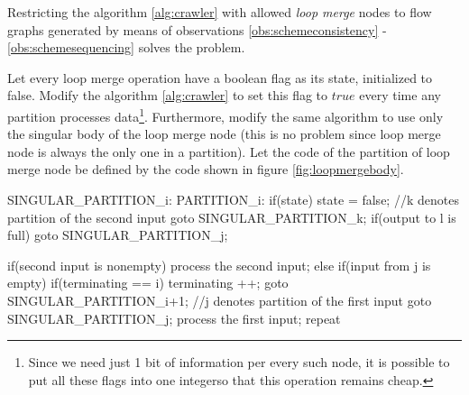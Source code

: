 
Restricting the algorithm \ref{alg:crawler} with allowed \emph{loop merge} nodes to flow graphs generated by means of observations \ref{obs:schemeconsistency} - \ref{obs:schemesequencing} solves the problem.

  Let every loop merge operation have a boolean flag as its state, initialized to false. Modify the algorithm \ref{alg:crawler} to set this flag to $true$ every time any partition processes data\footnote{Since we need just 1 bit of information per every such node, it is possible to put all these flags into one integer\footnotemark so that this operation remains cheap.}. Furthermore, modify the same algorithm to use only the singular body of the loop merge node (this is no problem since loop merge node is always the only one in a partition). Let the code of the partition of loop merge node be defined by the code shown in figure \ref{fig:loopmergebody}.
\myenddef
\mybeginfigloose
\begin{code}
SINGULAR_PARTITION_i:
PARTITION_i:
if(state)
{
  state = false;
  //k denotes partition of the second input
  goto SINGULAR_PARTITION_k; 
}
if(output to l is full)
  goto SINGULAR_PARTITION_j;
\end{code}
\begin{code}
if(second input is nonempty)
{
  process the second input;
}
else
{
  if(input from j is empty)
  {
    if(terminating == i) 
    {
      terminating ++;
      goto SINGULAR_PARTITION_i+1;
    }
    //j denotes partition of the first input
    goto SINGULAR_PARTITION_j;
  }
  process the first input;
}
repeat
\end{code}


